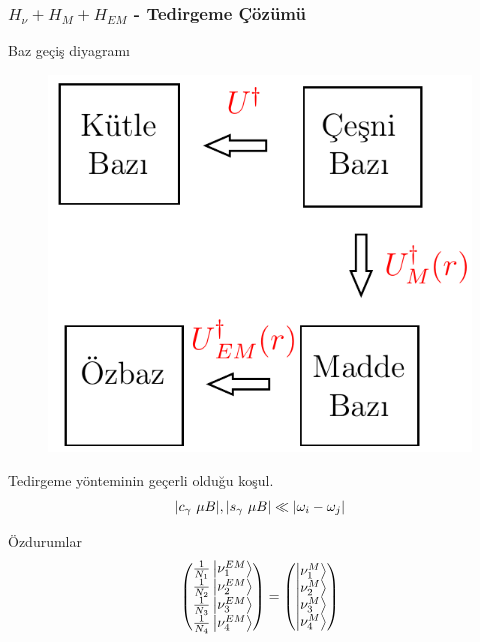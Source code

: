 \documentclass[10pt]{beamer}
\begin{document}
\begin{frame}[noframenumbering]
    \frametitle{$H_{\nu}+ H_{M}+ H_{EM}$ - Tedirgeme Çözümü}
    \begin{minipage}{0.45\textwidth}
        Baz geçiş diyagramı
        \begin{figure}[hbt!]
            \centering
            \includegraphics[width=.9\textwidth]{fig/tedirgemeDiagram.png}
        \end{figure}
        Tedirgeme yönteminin geçerli olduğu koşul.
        \begin{equation*}
            \abs{c_{\gamma}~\mu B}, \abs{s_{\gamma}~\mu B}  \ll \abs{\omega_{i}-\omega_{j}}
        \end{equation*}
    \end{minipage}
    \hfill
    \begin{minipage}{0.45\textwidth}
        Özdurumlar
        \tiny
        \begin{equation*}
            \mqty(
                \frac{1}{N_{1}}\ket{\nu^{EM}_{1}}\\
                \frac{1}{N_{2}}\ket{\nu^{EM}_{2}}\\
                \frac{1}{N_{3}}\ket{\nu^{EM}_{3}}\\
                \frac{1}{N_{4}}\ket{\nu^{EM}_{4}}) =
            \mqty(
                \ket{\nu^{M}_{1}}\\
                \ket{\nu^{M}_{2}}\\
                \ket{\nu^{M}_{3}}\\
                \ket{\nu^{M}_{4}})

\end{equation*}
\end{minipage}
\end{frame}
\end{document}

